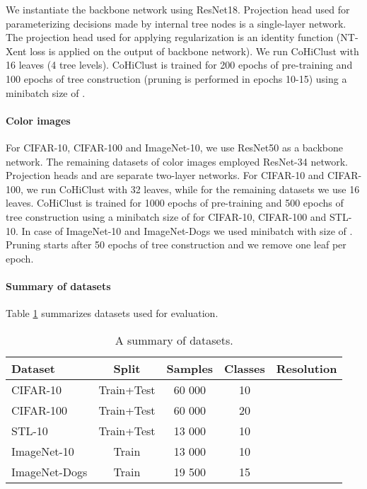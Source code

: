 \documentclass[runningheads]{llncs}
\def\our{CoHiClust}
\begin{document}
We instantiate the backbone network  using ResNet18. Projection head  used for parameterizing decisions made by internal tree nodes is a single-layer network. The projection head  used for applying regularization  is an identity function (NT-Xent loss is applied on the output of backbone network). We run \our{} with 16 leaves (4 tree levels). \our{} is trained for 200 epochs of pre-training and 100 epochs of tree construction (pruning is performed in epochs 10-15) using a minibatch size of . 




\paragraph{Color images}

For CIFAR-10, CIFAR-100 and ImageNet-10, we use ResNet50 as a backbone network. The remaining datasets of color images employed ResNet-34 network. Projection heads  and  are separate two-layer networks. For CIFAR-10 and CIFAR-100, we run \our{} with 32 leaves, while for the remaining datasets we use 16 leaves. \our{} is trained for 1000 epochs of pre-training and 500 epochs of tree construction using a minibatch size of  for CIFAR-10, CIFAR-100 and STL-10. In case of ImageNet-10 and ImageNet-Dogs we used minibatch with size of .   Pruning starts after 50 epochs of tree construction and we remove one leaf per epoch.

\paragraph{Summary of datasets} Table \ref{tab:data} summarizes datasets used for evaluation.

\begin{table}[!ht]
\centering
\caption{A summary of datasets.} \label{tab:data}
\footnotesize
\begin{tabular}{lcccc}
\toprule
 Dataset & Split & Samples & Classes & Resolution\\
\midrule
CIFAR-10 & Train+Test & 60 000 & 10 &  \\
CIFAR-100 & Train+Test & 60 000 & 20 &  \\
STL-10 & Train+Test & 13 000 & 10 &  \\
ImageNet-10 & Train & 13 000 & 10 & \\
ImageNet-Dogs & Train & 19 500 & 15 & \\
\bottomrule
\end{tabular}
\end{table}
\end{document}
